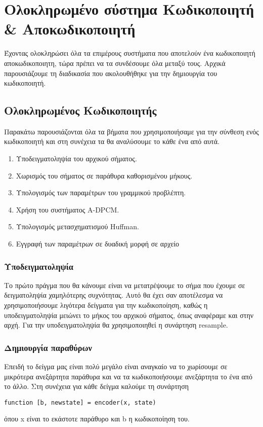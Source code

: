 \chapter{Ολοκληρωμένο σύστημα Κωδικοποιητή \& Αποκωδικοποιητή}

\par Έχοντας ολοκληρώσει όλα τα επιμέρους συστήματα που αποτελούν ένα κωδικοποιητή
αποκωδικοποιητη, τώρα πρέπει να τα συνδέσουμε όλα μεταξύ τους.
Αρχικά παρουσιάζουμε τη διαδικασία που ακολουθήθηκε για την δημιουργία
του κωδικοποιητή.

\section{Ολοκληρωμένος Κωδικοποιητής}
\par Παρακάτω παρουσιάζονται όλα τα βήματα που χρησιμοποιήσαμε για την σύνθεση ενός
κωδικοποιητή και στη συνέχεια τα θα αναλύσουμε το κάθε ένα από αυτά.
\begin{enumerate}
\item Υποδειγματοληψία του αρχικού σήματος.
\item Χωρισμός του σήματος σε παράθυρα καθορισμένου μήκους.
\item Υπολογισμός των παραμέτρων του γραμμικού προβλέπτη.
\item Χρήση του συστήματος A-DPCM.
\item Υπολογισμός μετασχηματισμού Huffman.
\item Εγγραφή των παραμέτρων σε δυαδική μορφή σε αρχείο
\end{enumerate}

\subsection{Υποδειγματοληψία}
\par Το πρώτο πράγμα που θα κάνουμε είναι να μετατρέψουμε το σήμα που έχουμε
σε δειγματοληψία χαμηλότερης συχνότητας. Αυτό θα έχει σαν αποτέλεσμα να χρησιμοποιήσουμε
λιγότερα δείγματα για την κωδικοποίηση, καθώς η υποδειγματοληψία μειώνει το μήκος
του αρχικού σήματος, όπως αναφέραμε και στην αρχή. Για την υποδειγματοληψία θα χρησιμοποιηθεί
η συνάρτηση resample.

\subsection{Δημιουργία παραθύρων}

\par Επειδή το δείγμα μας είναι πολύ μεγάλο είναι αναγκαίο να το χωρίσουμε
σε μικρότερα ανεξάρτητα παράθυρα και να τα κωδικοποιήσουμε ανεξάρτητα το ένα από
το άλλο. Στη συνέχεια για κάθε δείγμα καλούμε τη συνάρτηση
\begin{lstlisting}[style=MyMatlab]
 function [b, newstate] = encoder(x, state)
\end{lstlisting}
όπου x είναι το εκάστοτε παράθυρο και b η κωδικοποίηση του.

